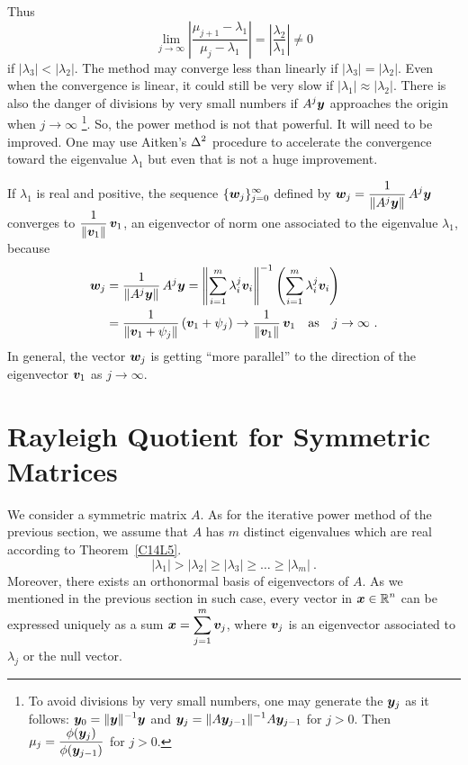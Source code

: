 Thus
\[
\lim_{j\rightarrow \infty}
\left| \frac{\mu_{j+1}-\lambda_1}{\mu_j-\lambda_1} \right|
= \left| \frac{\lambda_2}{\lambda_1} \right| \neq 0
\]
if $|\lambda_3| < |\lambda_2|$.  The method
may converge less than linearly if $|\lambda_3| = |\lambda_2|$.
Even when the convergence is linear, it could still be very slow if
$|\lambda_1| \approx |\lambda_2|$.  There is also the danger of
divisions by very small numbers if $\displaystyle A^j\bm{y}$
approaches the origin when $j \to \infty$ \footnote{To avoid divisions
by very small numbers, one may generate the $\bm{y}_j$ as it follows:
$\displaystyle \bm{y}_0 = \|\bm{y}\|^{-1}\bm{y}$ and
$\displaystyle \bm{y}_j = \| A\bm{y}_{j-1}\|^{-1} A\bm{y}_{j-1}$ for $j> 0$.
Then $\displaystyle \mu_j = \frac{\phi(\bm{y}_j)}{\phi(\bm{y}_{j-1})}$
for $j>0$.}.
So, the power method is not that powerful.  It will need to be
improved.  One may use Aitken's $\displaystyle \Delta^2$ procedure to
accelerate the convergence toward the eigenvalue $\lambda_1$ but even
that is not a huge improvement.

If $\lambda_1$ is real and positive, the sequence
$\displaystyle \{\bm{w}_j\}_{j=0}^\infty$ defined by
$\displaystyle \bm{w}_j = \frac{1}{\|A^j\bm{y}\|}\,A^j\bm{y}$ converges
to $\displaystyle \frac{1}{\|\bm{v}_1\|}\, \bm{v}_1$, an
eigenvector of norm one associated to the eigenvalue $\lambda_1$,
because
\begin{align*}
\bm{w}_j &= \frac{1}{\|A^j\bm{y}\|}\, A^j\bm{y}
= \displaystyle \left\| \sum_{i=1}^m \lambda_i^j \bm{v}_i\right\|^{-1}
\left( \sum_{i=1}^m \lambda_i^j \bm{v}_i \right) \\
&= \frac{1}{\displaystyle \left\| \bm{v}_1 + \psi_j \right\|}
\left( \bm{v}_1 + \psi_j \right)
\to \frac{1}{\displaystyle \| \bm{v}_1 \|} \, \bm{v}_1
\quad \text{as} \quad  j \to \infty \ .
\end{align*}
In general, the vector $\bm{w}_j$ is getting ``more parallel'' to
the direction of the eigenvector $\bm{v}_1$ as $j \to \infty$.

\section{Rayleigh Quotient for Symmetric Matrices}

We consider a \nn symmetric matrix $A$.  As for the iterative power method
of the previous section, we assume that $A$ has $m$ distinct
eigenvalues which are real according to Theorem~\ref{C14L5}.
\[
|\lambda_1| > |\lambda_2| \geq |\lambda_3| \geq \ldots \geq |\lambda_m| \ .
\]
Moreover, there exists an orthonormal basis of eigenvectors of $A$.
As we mentioned in the previous section in such case, 
every vector in $\displaystyle \bm{x} \in \mathbb{R}^n$ can be expressed
uniquely as a sum $\displaystyle \bm{x} = \sum_{j=1}^m \bm{v}_j$, where
$\bm{v}_j$ is an eigenvector associated to $\lambda_j$ or the null
vector.

